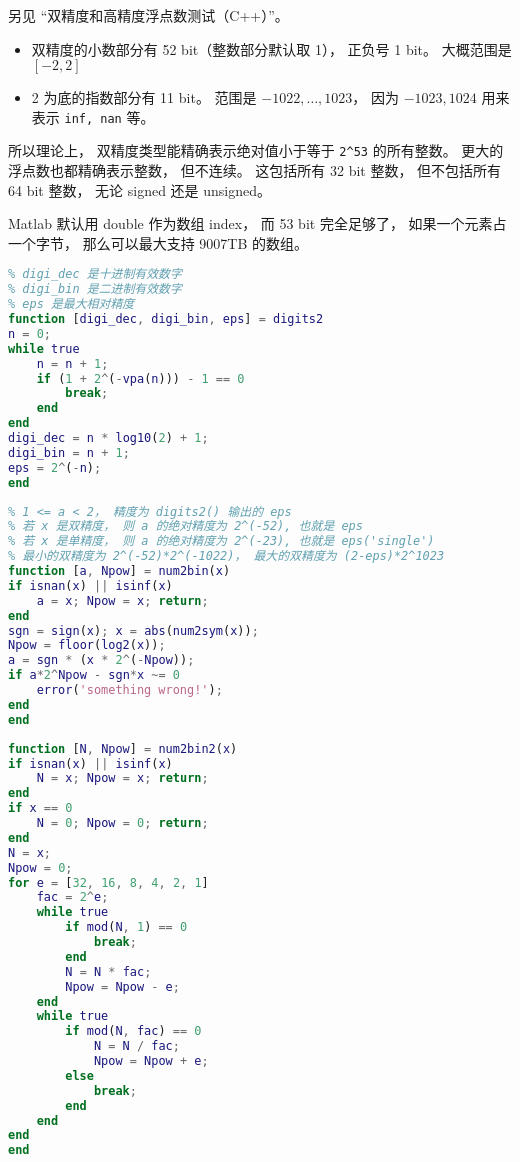 
\begin{issues}
\issueDraft
\end{issues}


另见 “双精度和高精度浮点数测试（C++）”。

\begin{itemize}
\item 双精度的小数部分有 52 bit（整数部分默认取 1）， 正负号 1 bit。 大概范围是 $[-2,2]$
\item 2 为底的指数部分有 11 bit。 范围是 $-1022,\dots,1023$， 因为 $-1023, 1024$ 用来表示 \verb|inf, nan| 等。
\end{itemize}

所以理论上， 双精度类型能精确表示绝对值小于等于 \verb|2^53| 的所有整数。 更大的浮点数也都精确表示整数， 但不连续。 这包括所有 32 bit 整数， 但不包括所有 64 bit 整数， 无论 signed 还是 unsigned。

Matlab 默认用 double 作为数组 index， 而 53 bit 完全足够了， 如果一个元素占一个字节， 那么可以最大支持 9007TB 的数组。

\begin{lstlisting}[language=matlab, caption=digits2.m]
% 求当前 vpa 变精度计算的有效数字
% digi_dec 是十进制有效数字
% digi_bin 是二进制有效数字
% eps 是最大相对精度
function [digi_dec, digi_bin, eps] = digits2
n = 0;
while true
    n = n + 1;
    if (1 + 2^(-vpa(n))) - 1 == 0
        break;
    end
end
digi_dec = n * log10(2) + 1;
digi_bin = n + 1;
eps = 2^(-n);
end
\end{lstlisting}

\begin{lstlisting}[language=matlab, caption=num2bin.m]
% x = a*2^Npw (exactly)
% 1 <= a < 2， 精度为 digits2() 输出的 eps
% 若 x 是双精度， 则 a 的绝对精度为 2^(-52), 也就是 eps
% 若 x 是单精度， 则 a 的绝对精度为 2^(-23), 也就是 eps('single')
% 最小的双精度为 2^(-52)*2^(-1022)， 最大的双精度为 (2-eps)*2^1023
function [a, Npow] = num2bin(x)
if isnan(x) || isinf(x)
    a = x; Npow = x; return;
end
sgn = sign(x); x = abs(num2sym(x));
Npow = floor(log2(x));
a = sgn * (x * 2^(-Npow));
if a*2^Npow - sgn*x ~= 0
    error('something wrong!');
end
end
\end{lstlisting}

\begin{lstlisting}[language=matlab, caption=num2bin2.m]
% 精确解出 x = N*2^Npow， 其中 N 是奇数和整数, Npow 是整数
function [N, Npow] = num2bin2(x)
if isnan(x) || isinf(x)
    N = x; Npow = x; return;
end
if x == 0
    N = 0; Npow = 0; return;
end
N = x;
Npow = 0;
for e = [32, 16, 8, 4, 2, 1]
    fac = 2^e;
    while true
        if mod(N, 1) == 0
            break;
        end
        N = N * fac;
        Npow = Npow - e;
    end
    while true
        if mod(N, fac) == 0
            N = N / fac;
            Npow = Npow + e;
        else
            break;
        end
    end
end
end
\end{lstlisting}

